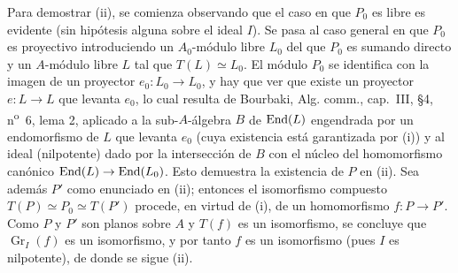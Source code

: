 Para demostrar (ii), se comienza observando que el caso en que $P_0$ es libre es evidente (sin hipótesis alguna sobre el ideal $I$). Se pasa al caso general en que $P_0$ es proyectivo introduciendo un $A_0$-módulo libre $L_0$ del que $P_0$ es sumando directo y un $A$-módulo libre $L$ tal que $T(L)\simeq L_0$. El módulo $P_0$ se identifica con la imagen de un proyector $e_0:L_0\to L_0$, y hay que ver que existe un proyector $e:L\to L$ que levanta $e_0$, lo cual resulta de Bourbaki, Alg. comm., cap.~III, §4, n\textsuperscript{o}~6, lema 2, aplicado a la sub-$A$-álgebra $B$ de $\operatorname{End}(L)$ engendrada por un endomorfismo de $L$ que levanta $e_0$ (cuya existencia está garantizada por (i)) y al ideal (nilpotente) dado por la intersección de $B$ con el núcleo del homomorfismo canónico $\operatorname{End}(L)\to\operatorname{End}(L_0)$. Esto demuestra la existencia de $P$ en (ii). Sea además $P'$ como enunciado en (ii); entonces el isomorfismo compuesto $T(P)\simeq P_0\simeq T(P')$ procede, en virtud de (i), de un homomorfismo $f:P\to P'$. Como $P$ y $P'$ son planos sobre $A$ y $T(f)$ es un isomorfismo, se concluye que $\operatorname{Gr}_I(f)$ es un isomorfismo, y por tanto $f$ es un isomorfismo (pues $I$ es nilpotente), de donde se sigue (ii).
